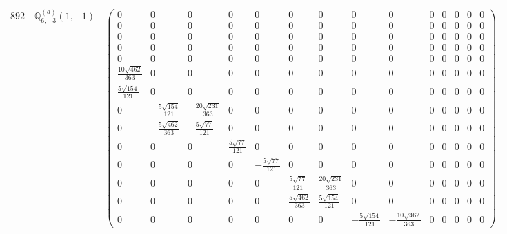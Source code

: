 \documentclass[fleqn,8pt,landscape]{jsarticle}
\begin{document}
\begin{center}
\begin{longtable}{ccc}
$ 892 $ & $ \mathbb{Q}_{6,-3}^{(a)}(1,-1) $ & $ \begin{pmatrix} 0 & 0 & 0 & 0 & 0 & 0 & 0 & 0 & 0 & 0 & 0 & 0 & 0 & 0 \\ 0 & 0 & 0 & 0 & 0 & 0 & 0 & 0 & 0 & 0 & 0 & 0 & 0 & 0 \\ 0 & 0 & 0 & 0 & 0 & 0 & 0 & 0 & 0 & 0 & 0 & 0 & 0 & 0 \\ 0 & 0 & 0 & 0 & 0 & 0 & 0 & 0 & 0 & 0 & 0 & 0 & 0 & 0 \\ 0 & 0 & 0 & 0 & 0 & 0 & 0 & 0 & 0 & 0 & 0 & 0 & 0 & 0 \\ \frac{10 \sqrt{462}}{363} & 0 & 0 & 0 & 0 & 0 & 0 & 0 & 0 & 0 & 0 & 0 & 0 & 0 \\ \frac{5 \sqrt{154}}{121} & 0 & 0 & 0 & 0 & 0 & 0 & 0 & 0 & 0 & 0 & 0 & 0 & 0 \\ 0 & - \frac{5 \sqrt{154}}{121} & - \frac{20 \sqrt{231}}{363} & 0 & 0 & 0 & 0 & 0 & 0 & 0 & 0 & 0 & 0 & 0 \\ 0 & - \frac{5 \sqrt{462}}{363} & - \frac{5 \sqrt{77}}{121} & 0 & 0 & 0 & 0 & 0 & 0 & 0 & 0 & 0 & 0 & 0 \\ 0 & 0 & 0 & \frac{5 \sqrt{77}}{121} & 0 & 0 & 0 & 0 & 0 & 0 & 0 & 0 & 0 & 0 \\ 0 & 0 & 0 & 0 & - \frac{5 \sqrt{77}}{121} & 0 & 0 & 0 & 0 & 0 & 0 & 0 & 0 & 0 \\ 0 & 0 & 0 & 0 & 0 & \frac{5 \sqrt{77}}{121} & \frac{20 \sqrt{231}}{363} & 0 & 0 & 0 & 0 & 0 & 0 & 0 \\ 0 & 0 & 0 & 0 & 0 & \frac{5 \sqrt{462}}{363} & \frac{5 \sqrt{154}}{121} & 0 & 0 & 0 & 0 & 0 & 0 & 0 \\ 0 & 0 & 0 & 0 & 0 & 0 & 0 & - \frac{5 \sqrt{154}}{121} & - \frac{10 \sqrt{462}}{363} & 0 & 0 & 0 & 0 & 0 \end{pmatrix} $ \\ \hline

\end{longtable}
\end{center}
\end{document}
